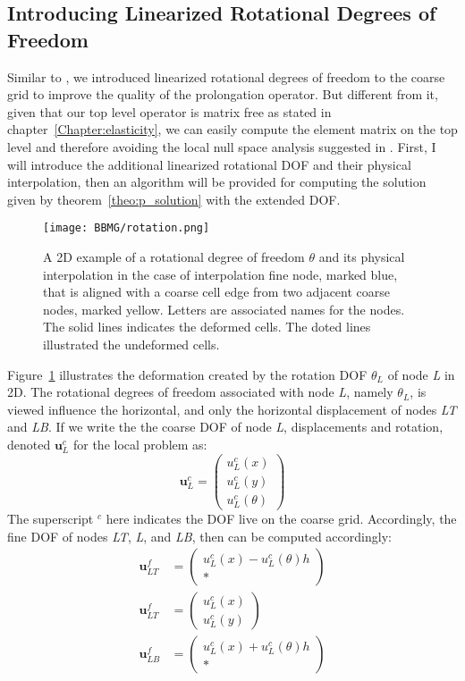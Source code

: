 \subsection{Introducing Linearized Rotational Degrees of Freedom}
Similar to \cite{dohrmann2007interpolation}, we introduced linearized rotational degrees of freedom to the coarse grid to improve the quality of the prolongation operator. But different from it, given that our top level operator is matrix free as stated in chapter~\ref{Chapter:elasticity}, we can easily compute the element matrix on the top level and therefore avoiding the local null space analysis suggested in \cite{dohrmann2007interpolation}. First, I will introduce the additional linearized rotational DOF and their physical interpolation, then an algorithm will be provided for computing the solution given by theorem~\ref{theo:p_solution} with the extended DOF.
\begin{figure}[t]
\texttt{[image: BBMG/rotation.png]}
\centering
\caption{A 2D example of a rotational degree of freedom $\theta$ and its physical interpolation in the case of interpolation fine node, marked blue, that is aligned with a coarse cell edge from two adjacent coarse nodes, marked yellow. Letters are associated names for the nodes. The solid lines indicates the deformed cells. The doted lines illustrated the undeformed cells.}
\label{fig:rotation_2D}
\end{figure}
Figure~\ref{fig:rotation_2D} illustrates the deformation created by the rotation DOF $\theta_L$ of node \textit{L} in 2D. The rotational degrees of freedom associated with node \textit{L}, namely $\theta_L$, is viewed influence the horizontal, and only the horizontal displacement of nodes \textit{LT} and \textit{LB}. If we write the the coarse DOF of node \textit{L}, displacements and rotation, denoted $\mathbf{u}^c_L$ for the local problem as:
$$
\mathbf{u}^c_L = \left(\begin{array}{c}u^c_L(x) \\ u^c_L(y) \\ u^c_L(\theta) \end{array}\right)
$$
The superscript $^c$ here indicates the DOF live on the coarse grid. Accordingly, the fine DOF of nodes \textit{LT}, \textit{L}, and \textit{LB}, then can be computed accordingly:
\begin{align*}
 \mathbf{u}^f_{LT} &= \left(\begin{array}{c} u^c_L(x) - u^c_L(\theta)h \\ * \end{array}\right) \\
 \mathbf{u}^f_{LT} &= \left(\begin{array}{c} u^c_L(x) \\ u^c_L(y) \end{array}\right) \\
 \mathbf{u}^f_{LB} &= \left(\begin{array}{c} u^c_L(x) + u^c_L(\theta)h \\ * \end{array}\right) 
\end{align*}
